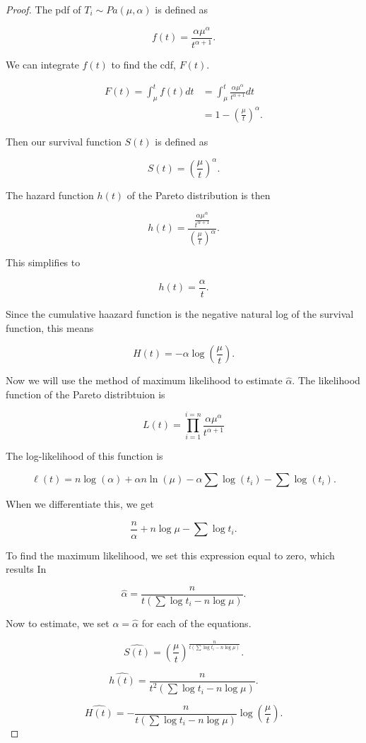 \documentclass{article}
\begin{document}
	\begin{proof}
	The pdf of $T_i \sim Pa(\mu, \alpha)$ is defined as

	\[ f(t) = \frac{\alpha\mu^\alpha}{t^{\alpha + 1}}.\] %

	We can integrate $f(t)$ to find the cdf, $F(t)$.

	\begin{align*}
		F(t) = \int_{\mu}^{t} f(t)dt & = \int_{\mu}^{t} \frac{\alpha\mu^\alpha}{t^{\alpha + 1}} dt \\
		& = 1 - \left( \frac{\mu}{t} \right)^\alpha .
	\end{align*} %

	Then our survival function $S(t)$ is defined as

	\[S(t) = \left( \frac{\mu}{t} \right)^\alpha .\] %

	The hazard function $h(t)$ of the Pareto distribution is then
	
	\[h(t) = \frac{ \frac{\alpha\mu^\alpha}{t^{\alpha + 1}} }{ \left( \frac{\mu}{t}\right) ^\alpha } .\]

	This simplifies to

	\[ h(t) = \frac{\alpha}{t}.\]

	Since the cumulative haazard function is the negative natural log of the survival function, this means

	\[ H(t) = -\alpha \log \left( \frac{\mu}{t} \right). \]

	
	Now we will use the method of maximum likelihood to estimate $\hat{\alpha}$. The likelihood function of the Pareto distribtuion is

	\[L(t) = \prod_{i = 1}^{i = n} \frac{\alpha\mu^\alpha}{t^{\alpha + 1}}\]

	The log-likelihood of this function is

	\[\ell(t) = n\log(\alpha) + \alpha n \ln(\mu) - \alpha\sum \log(t_i) - \sum \log(t_i).\]

	When we differentiate this, we get

	\[ \frac{n}{\alpha} + n \log\mu - \sum\log t_i.\]

	To find the maximum likelihood, we set this expression equal to zero, which results In

	\[\hat{\alpha} = \frac{n}{t(\sum\log t_i - n\log\mu ) }.\]

	Now to estimate, we set $\alpha = \hat{\alpha}$ for each of the equations.

	\[ \widehat{S(t)} = \left( \frac{\mu}{t} \right)^{\frac{n}{t(\sum\log t_i - n\log\mu ) } }. \]

	\[ \widehat{h(t)} = \frac{n}{t^2(\sum\log t_i - n\log\mu ) }. \]

	\[ \widehat{H(t)} = - \frac{n}{t(\sum\log t_i - n\log\mu ) } \log \left( \frac{\mu}{t} \right). \]
	\end{proof}
\end{document}
